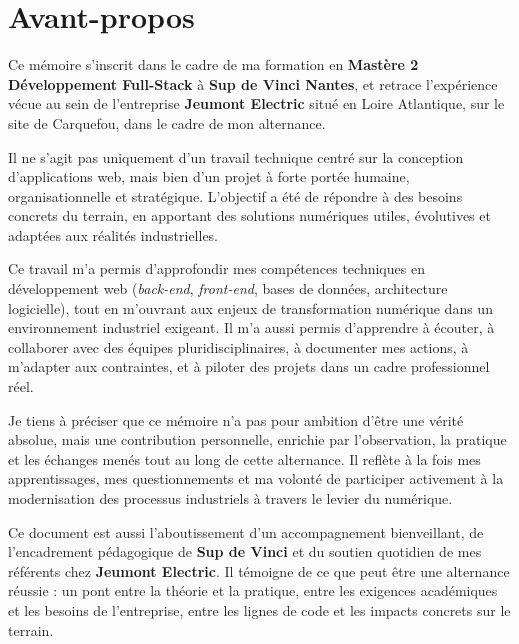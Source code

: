 \documentclass[11pt,a4paper]{article}
\begin{document}
\section*{Avant-propos}
\thispagestyle{empty}
\begin{flushleft}
Ce mémoire s’inscrit dans le cadre de ma formation en \textbf{Mastère 2 Développement Full-Stack} à \textbf{Sup de Vinci Nantes}, et retrace l’expérience vécue au sein de l’entreprise \textbf{Jeumont Electric} situé en Loire Atlantique, sur le site de Carquefou, dans le cadre de mon alternance.

\vspace{0.5em}
Il ne s’agit pas uniquement d’un travail technique centré sur la conception d’applications web, mais bien d’un projet à forte portée humaine, organisationnelle et stratégique. L’objectif a été de répondre à des besoins concrets du terrain, en apportant des solutions numériques utiles, évolutives et adaptées aux réalités industrielles.

\vspace{0.5em}
Ce travail m’a permis d'approfondir mes compétences techniques en développement web (\textit{back-end}, \textit{front-end}, bases de données, architecture logicielle), tout en m’ouvrant aux enjeux de transformation numérique dans un environnement industriel exigeant. Il m’a aussi permis d’apprendre à écouter, à collaborer avec des équipes pluridisciplinaires, à documenter mes actions, à m’adapter aux contraintes, et à piloter des projets dans un cadre professionnel réel.

\vspace{0.5em}
Je tiens à préciser que ce mémoire n’a pas pour ambition d’être une vérité absolue, mais une contribution personnelle, enrichie par l’observation, la pratique et les échanges menés tout au long de cette alternance. Il reflète à la fois mes apprentissages, mes questionnements et ma volonté de participer activement à la modernisation des processus industriels à travers le levier du numérique.

\vspace{0.5em}
Ce document est aussi l’aboutissement d’un accompagnement bienveillant, de l’encadrement pédagogique de \textbf{Sup de Vinci} et du soutien quotidien de mes référents chez \textbf{Jeumont Electric}. Il témoigne de ce que peut être une alternance réussie : un pont entre la théorie et la pratique, entre les exigences académiques et les besoins de l’entreprise, entre les lignes de code et les impacts concrets sur le terrain.
\end{flushleft}
\end{document}
